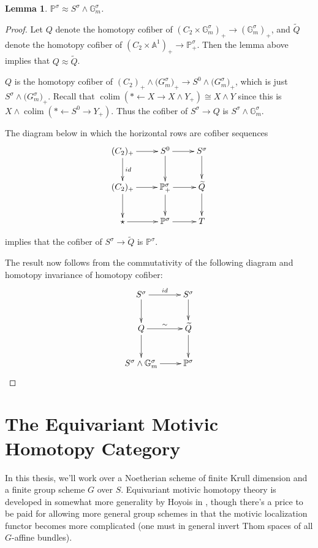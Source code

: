 \documentclass[edeposit,fullpage]{uiucthesis2009}
\newcommand{\mbb}{\mathbb}
\DeclareMathOperator*{\colim}{colim}
\theoremstyle{plain}
\newtheorem{lemma}{Lemma}
\numberwithin{lemma}{section}
\theoremstyle{definition}
\begin{document}
\begin{lemma}
$\mbb P^\sigma \approx S^\sigma \wedge \mbb G_m^\sigma$.
\end{lemma}

\begin{proof}
Let $Q$ denote the homotopy cofiber of $(C_2 \times \mbb G_m^\sigma)_+
\rightarrow (\mbb G_m^\sigma)_+$, and $\widetilde Q$ denote the homotopy
cofiber of $(C_2 \times \mbb A^1)_+ \rightarrow \mbb P^\sigma_+$. Then the
lemma above implies that $Q \approx \widetilde Q$. 

$Q$ is the homotopy cofiber of $
(C_2)_+ \wedge \mbb (G_m^\sigma)_+ \rightarrow S^0 \wedge \mbb
(G_m^\sigma)_+$, which is just $S^\sigma \wedge \mbb
(G_m^\sigma)_+$. Recall that $\colim(* \leftarrow X \rightarrow X
\wedge Y_+) \cong X \wedge Y$ since this is $X \wedge \colim(*
\leftarrow S^0 \rightarrow Y_+)$. Thus the cofiber of $S^\sigma
\rightarrow Q$ is $S^\sigma \wedge \mbb G_m^\sigma$.

The diagram below in which the horizontal rows are cofiber sequences
\[
\xymatrix{(C_2)_+ \ar[r]\ar[d]^{id} & S^0 \ar[d] \ar[r]& S^\sigma
  \ar[d] \\(C_2)_+ \ar[r]\ar[d] & \ar[r]\ar[d] \mbb P^\sigma_+ & \widetilde
  Q \ar[d] \\ \star \ar[r] & \mbb P^\sigma \ar[r] & T }
\]

implies that the cofiber of $S^\sigma \rightarrow \widetilde Q$ is
$\mbb P^\sigma$. 

The result now follows from the commutativity of the following diagram
and homotopy invariance of homotopy cofiber:
\[
\xymatrix{S^\sigma \ar[r]^{id}\ar[d] & S^\sigma \ar[d] \\ Q \ar[r]^{\sim} \ar[d]&
\widetilde Q \ar[d]\\ S^\sigma \wedge \mbb G_m^\sigma \ar[r] & \mbb P^\sigma}
\]

\end{proof}

\section{The Equivariant Motivic Homotopy Category}\label{sec:cat_def}

In this thesis, we'll work over a Noetherian scheme of finite Krull
dimension and a finite group scheme $G$ over $S$. Equivariant motivic
homotopy theory is developed in somewhat more generality by Hoyois in
\cite{HoyoisSixOp}, though there's a price to be paid for allowing
more general group schemes in that the motivic localization functor becomes more
complicated (one must in general invert Thom spaces of all $G$-affine
bundles).  
\end{document}
